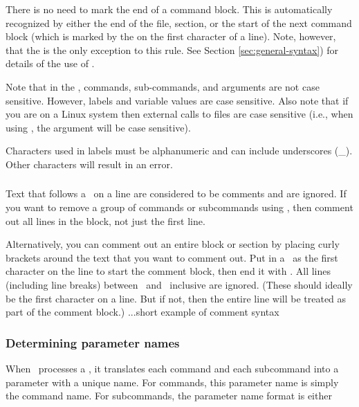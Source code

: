 There is no need to mark the end of a command block. This is automatically recognized by either the end of the file, section, or the start of the next command block (which is marked by the \command{} on the first character of a line). Note, however, that the  is the only exception to this rule. See Section \ref{sec:general-syntax}) for details of the use of . 

Note that in the \config, commands, sub-commands, and arguments are not case sensitive. However, labels and variable values are case sensitive. Also note that if you are on a Linux system then external calls to files are case sensitive (i.e., when using  , the argument  will be case sensitive). 

Characters used in labels must be alphanumeric and can include underscores (\_). Other characters will result in an error.

\subsubsection{}
\CH
Text that follows a \commentline\ on a line are considered to be comments and are ignored. If you want to remove a group of commands or subcommands using \commentline, then comment out all lines in the block, not just the first line. 

Alternatively, you can comment out an entire block or section by placing curly brackets around the text that you want to comment out. Put in a \commentstart\ as the first character on the line to start the comment block, then end it with \commentend. All lines (including line breaks) between \commentstart\ and \commentend\ inclusive are ignored. (These should ideally be the first character on a line. But if not, then the entire line will be treated as part of the comment block.)
\EX ...short example of comment syntax \EXend

\subsubsection{Determining parameter names\label{sec:parameter-names}}
\CH
When \iSAM\ processes a \config, it translates each command and each subcommand into a parameter with a unique name. For commands, this parameter name is simply the command name. For subcommands, the parameter name format is either 


